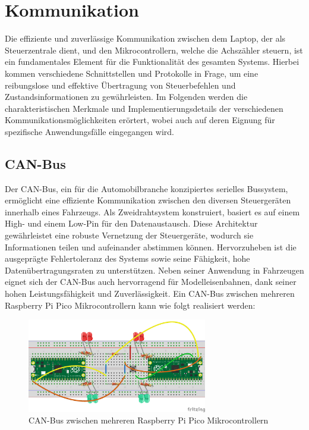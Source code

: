 \section{Kommunikation}\label{text:Methodik:Kommunikation}

Die effiziente und zuverlässige Kommunikation zwischen dem Laptop, der als Steuerzentrale dient, und den Mikrocontrollern, welche die Achszähler steuern, ist ein fundamentales Element für die Funktionalität des gesamten Systems. Hierbei kommen verschiedene Schnittstellen und Protokolle in Frage, um eine reibungslose und effektive Übertragung von Steuerbefehlen und Zustandsinformationen zu gewährleisten. Im Folgenden werden die charakteristischen Merkmale und Implementierungsdetails der verschiedenen Kommunikationsmöglichkeiten erörtert, wobei auch auf deren Eignung für spezifische Anwendungsfälle eingegangen wird.

\subsection{CAN-Bus}\label{text:Methodik:Kommunikation:CAN-Bus}

Der CAN-Bus, ein für die Automobilbranche konzipiertes serielles Bussystem, ermöglicht eine effiziente Kommunikation zwischen den diversen Steuergeräten innerhalb eines Fahrzeugs. Als Zweidrahtsystem konstruiert, basiert es auf einem High- und einem Low-Pin für den Datenaustausch. Diese Architektur gewährleistet eine robuste Vernetzung der Steuergeräte, wodurch sie Informationen teilen und aufeinander abstimmen können. Hervorzuheben ist die ausgeprägte Fehlertoleranz des Systems sowie seine Fähigkeit, hohe Datenübertragungsraten zu unterstützen. Neben seiner Anwendung in Fahrzeugen eignet sich der CAN-Bus auch hervorragend für Modelleisenbahnen, dank seiner hohen Leistungsfähigkeit und Zuverlässigkeit. Ein CAN-Bus zwischen mehreren Raspberry Pi Pico Mikrocontrollern kann wie folgt realisiert werden:

\begin{figure}[H]
    \centering
    \includegraphics[width=0.7\textwidth]{Assets/Images/3-Methodik/CANBus-Test.png}
    \caption{CAN-Bus zwischen mehreren Raspberry Pi Pico Mikrocontrollern}\label{fig:Methodik:Kommunikation:CAN-Bus}
\end{figure}

